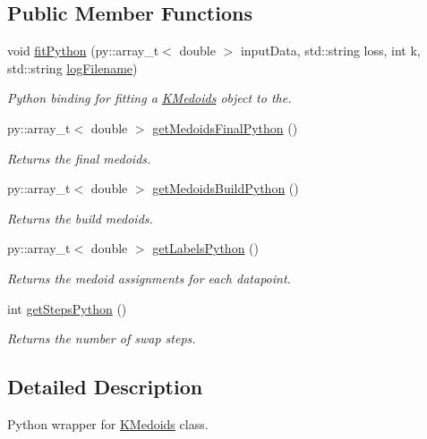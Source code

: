\subsection*{Public Member Functions}
\begin{DoxyCompactItemize}
\item 
void \hyperlink{classKMedoidsWrapper_a84e7535d6cdd70187c774811a210adc6}{fit\+Python} (py\+::array\+\_\+t$<$ double $>$ input\+Data, std\+::string loss, int k, std\+::string \hyperlink{classKMedoids_a3cf57e612442072fb377b1714fc5e12e}{log\+Filename})
\begin{DoxyCompactList}\small\item\em Python binding for fitting a \hyperlink{classKMedoids}{K\+Medoids} object to the. \end{DoxyCompactList}\item 
py\+::array\+\_\+t$<$ double $>$ \hyperlink{classKMedoidsWrapper_ae825241c43b8bf92912eb59cd12ae1c5}{get\+Medoids\+Final\+Python} ()
\begin{DoxyCompactList}\small\item\em Returns the final medoids. \end{DoxyCompactList}\item 
py\+::array\+\_\+t$<$ double $>$ \hyperlink{classKMedoidsWrapper_af272debff6f3b31490d20b8dc7bec322}{get\+Medoids\+Build\+Python} ()
\begin{DoxyCompactList}\small\item\em Returns the build medoids. \end{DoxyCompactList}\item 
py\+::array\+\_\+t$<$ double $>$ \hyperlink{classKMedoidsWrapper_aba0a92e75230b7853fd533657ead656e}{get\+Labels\+Python} ()
\begin{DoxyCompactList}\small\item\em Returns the medoid assignments for each datapoint. \end{DoxyCompactList}\item 
int \hyperlink{classKMedoidsWrapper_a25ac2830354eeae7963cdec34d0137e8}{get\+Steps\+Python} ()
\begin{DoxyCompactList}\small\item\em Returns the number of swap steps. \end{DoxyCompactList}\end{DoxyCompactItemize}


\subsection{Detailed Description}
Python wrapper for \hyperlink{classKMedoids}{K\+Medoids} class. 

